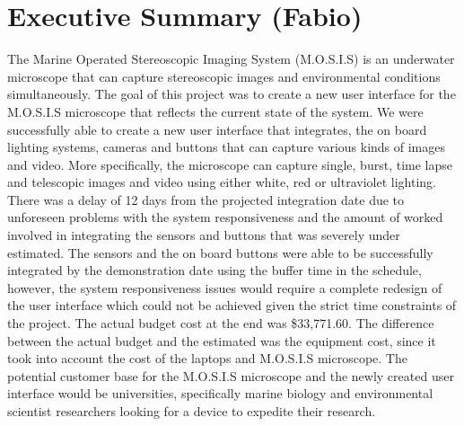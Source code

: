 \section*{Executive Summary (Fabio)}
\begin{spacing}{1.5}
The Marine Operated Stereoscopic Imaging System (M.O.S.I.S) is an underwater microscope that can capture stereoscopic images and environmental conditions simultaneously. The goal of this project was to create a new user interface for the M.O.S.I.S microscope that reflects the current state of the system. We were successfully able to create a new user interface that integrates, the on board lighting systems, cameras and buttons that can capture various kinds of images and video. More specifically, the microscope can capture single, burst, time lapse and telescopic images and video using either white, red or ultraviolet lighting. There was a delay of 12 days from the projected integration date due to unforeseen problems with the system responsiveness and the amount of worked involved in integrating the sensors and buttons that was severely under estimated. The sensors and the on board buttons were able to be successfully integrated by the demonstration date using the buffer time in the schedule, however, the system responsiveness issues would require a complete redesign of the user interface which could not be achieved given the strict time constraints of the project. The actual budget cost at the end was \$33,771.60. The difference between the actual budget and the estimated was the equipment cost, since it took into account the cost of the laptops and M.O.S.I.S microscope. The potential customer base for the M.O.S.I.S microscope and the newly created user interface would be universities, specifically marine biology and environmental scientist researchers looking for a device to expedite their research.
\end{spacing}